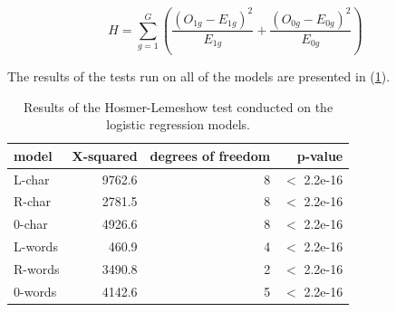 \begin{equation}\label{eq:hoslem}
H = \sum_{g=1}^{G}\left(\frac{(O_{1g}-E_{1g})^2}{E_{1g}} + \frac{(O_{0g}-E_{0g})^2}{E_{0g}}\right)
\end{equation}

The results of the tests run on all of the models are presented in (\ref{tab:hoslem}).

\begin{table}[hbt!]
\begin{tabular}{l|r|r|r|}
model & X-squared & degrees of freedom & p-value\\\hline
L-char & 9762.6 & 8 & $<$ 2.2e-16\\
R-char & 2781.5 & 8 & $<$ 2.2e-16\\
0-char & 4926.6 & 8 & $<$ 2.2e-16\\
L-words & 460.9 & 4 & $<$ 2.2e-16\\
R-words & 3490.8 & 2 & $<$ 2.2e-16\\
0-words & 4142.6 & 5 & $<$ 2.2e-16
\end{tabular}
\caption{Results of the Hosmer-Lemeshow test conducted on the logistic regression models.}
\label{tab:hoslem}
\end{table}
